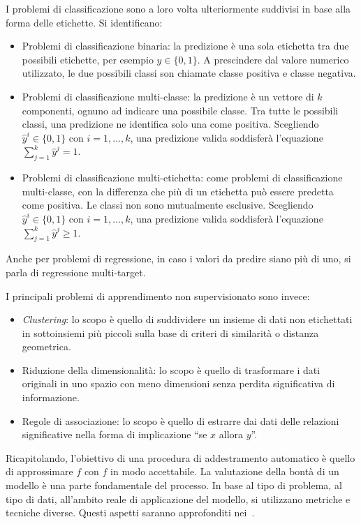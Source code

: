 I problemi di classificazione sono a loro volta ulteriormente suddivisi in base alla forma delle etichette. Si identificano:
\begin{itemize}
    \item Problemi di classificazione binaria: la predizione è una sola etichetta tra due possibili etichette, per esempio $\hat{y} \in \{0,1\}$. A prescindere dal valore numerico utilizzato, le due possibili classi son chiamate classe positiva e classe negativa.
    \item Problemi di classificazione multi-classe: la predizione è un vettore di $k$ componenti, ognuno ad indicare una possibile classe. Tra tutte le possibili classi, una predizione ne identifica solo una come positiva. Scegliendo $\hat{y}^i \in \{0,1\}$ con $i=1,\dots,k$, una predizione valida soddisferà l'equazione $\sum_{j=1}^{k} \hat{y}^j =1$.  
    \item Problemi di classificazione multi-etichetta: come problemi di classificazione multi-classe, con la differenza che più di un etichetta può essere predetta come positiva. Le classi non sono mutualmente esclusive. Scegliendo $\hat{y}^i \in \{0,1\}$ con $i=1,\dots,k$, una predizione valida soddisferà l'equazione $\sum_{j=1}^{k} \hat{y}^j \geq 1$.  
\end{itemize}

Anche per problemi di regressione, in caso i valori da predire siano più di uno, si parla di regressione multi-target.

I principali problemi di apprendimento non supervisionato sono invece:
\begin{itemize}
    \item \emph{Clustering}: lo scopo è quello di suddividere un insieme di dati non etichettati in sottoinsiemi più piccoli sulla base di criteri di similarità o distanza geometrica.
    \item Riduzione della dimensionalità: lo scopo è quello di trasformare i dati originali in uno spazio con meno dimensioni senza perdita significativa di informazione.
    \item Regole di associazione: lo scopo è quello di estrarre dai dati delle relazioni significative nella forma di implicazione ``se $x$ allora $y$''.
\end{itemize}

Ricapitolando, l'obiettivo di una procedura di addestramento automatico è quello di approssimare $f$ con $\hat{f}$ in modo accettabile.
La valutazione della bontà di un modello è una parte fondamentale del processo.
In base al tipo di problema, al tipo di dati, all'ambito reale di applicazione del modello, si utilizzano metriche e tecniche diverse.
Questi aspetti saranno approfonditi nei~.


